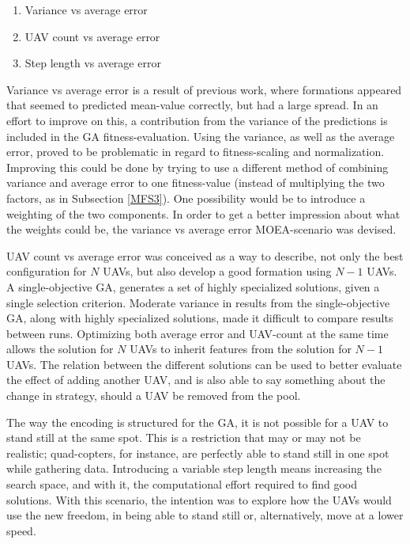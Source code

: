 \documentclass[10pt,a4paper]{book}
\begin{document}
\begin{enumerate}
\item Variance vs average error
\item \gls{UAV} count vs average error
\item Step length vs average error
\end{enumerate}

Variance vs average error is a result of previous work, where formations appeared that seemed to predicted mean-value correctly, but had a large spread. In an effort to improve on this, a contribution from the variance of the predictions is included in the \gls{GA} fitness-evaluation. Using the variance, as well as the average error, proved to be problematic in regard to fitness-scaling and normalization. Improving this could be done by trying to use a different method of combining variance and average error to one fitness-value (instead of multiplying the two factors, as in Subsection \ref{MFS3}). One possibility would be to introduce a weighting of the two components. In order to get a better impression about what the weights could be, the variance vs average error \gls{MOEA}-scenario was devised.

\gls{UAV} count vs average error was conceived as a way to describe, not only the best configuration for $N$ \glspl{UAV}, but also develop a good formation using $N-1$ \glspl{UAV}. A single-objective \gls{GA}, generates a set of highly specialized solutions, given a single selection criterion. Moderate variance in results from the single-objective \gls{GA}, along with highly specialized solutions, made it difficult to compare results between runs. Optimizing both average error and \gls{UAV}-count at the same time allows the solution for $N$ \glspl{UAV} to inherit features from the solution for $N-1$ \glspl{UAV}. The relation between the different solutions can be used to better evaluate the effect of adding another \gls{UAV}, and is also able to say something about the change in strategy, should a \gls{UAV} be removed from the pool. 

The way the encoding is structured for the \gls{GA}, it is not possible for a \gls{UAV} to stand still at the same spot. This is a restriction that may or may not be realistic; quad-copters, for instance, are perfectly able to stand still in one spot while gathering data. Introducing a variable step length means increasing the search space, and with it, the computational effort required to find good solutions. With this scenario, the intention was to explore how the \glspl{UAV} would use the new freedom, in being able to stand still or, alternatively, move at a lower speed.
\end{document}
